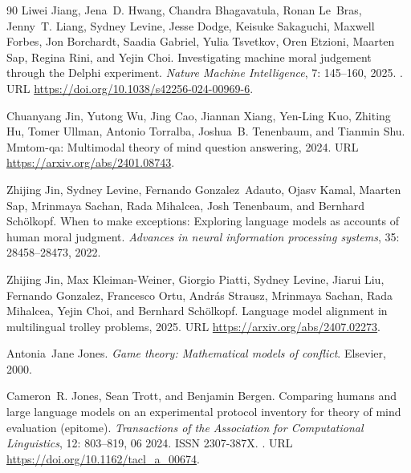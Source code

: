 \begin{thebibliography}{90}
Liwei Jiang, Jena~D. Hwang, Chandra Bhagavatula, Ronan Le~Bras, Jenny~T. Liang, Sydney Levine, Jesse Dodge, Keisuke Sakaguchi, Maxwell Forbes, Jon Borchardt, Saadia Gabriel, Yulia Tsvetkov, Oren Etzioni, Maarten Sap, Regina Rini, and Yejin Choi.
\newblock Investigating machine moral judgement through the {Delphi} experiment.
\newblock \emph{Nature Machine Intelligence}, 7: 145--160, 2025.
\newblock {}.
\newblock URL \url{https://doi.org/10.1038/s42256-024-00969-6}.

Chuanyang Jin, Yutong Wu, Jing Cao, Jiannan Xiang, Yen-Ling Kuo, Zhiting Hu, Tomer Ullman, Antonio Torralba, Joshua~B. Tenenbaum, and Tianmin Shu.
\newblock Mmtom-qa: Multimodal theory of mind question answering, 2024.
\newblock URL \url{https://arxiv.org/abs/2401.08743}.

Zhijing Jin, Sydney Levine, Fernando Gonzalez~Adauto, Ojasv Kamal, Maarten Sap, Mrinmaya Sachan, Rada Mihalcea, Josh Tenenbaum, and Bernhard Sch{\"o}lkopf.
\newblock When to make exceptions: Exploring language models as accounts of human moral judgment.
\newblock \emph{Advances in neural information processing systems}, 35: 28458--28473, 2022.

Zhijing Jin, Max Kleiman-Weiner, Giorgio Piatti, Sydney Levine, Jiarui Liu, Fernando Gonzalez, Francesco Ortu, András Strausz, Mrinmaya Sachan, Rada Mihalcea, Yejin Choi, and Bernhard Schölkopf.
\newblock Language model alignment in multilingual trolley problems, 2025.
\newblock URL \url{https://arxiv.org/abs/2407.02273}.

Antonia~Jane Jones.
\newblock \emph{Game theory: Mathematical models of conflict}.
\newblock Elsevier, 2000.

Cameron~R. Jones, Sean Trott, and Benjamin Bergen.
\newblock Comparing humans and large language models on an experimental protocol inventory for theory of mind evaluation (epitome).
\newblock \emph{Transactions of the Association for Computational Linguistics}, 12: 803--819, 06 2024.
\newblock ISSN 2307-387X.
\newblock {}.
\newblock URL \url{https://doi.org/10.1162/tacl_a_00674}.


\end{thebibliography}
